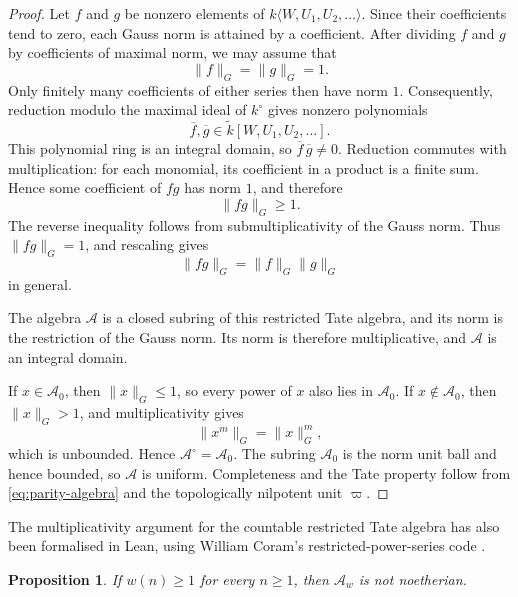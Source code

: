 \documentclass[11pt,reqno]{amsart}
\newtheorem{proposition}[proposition]{Proposition}
\theoremstyle{definition}
\begin{document}
\begin{proof}
Let $f$ and $g$ be nonzero elements of
$k\langle W,U_1,U_2,\ldots\rangle$.  Since their coefficients tend to zero,
each Gauss norm is attained by a coefficient.  After dividing $f$ and $g$ by
coefficients of maximal norm, we may assume that
\[
  \lVert f\rVert_G=\lVert g\rVert_G=1.
\]
Only finitely many coefficients of either series then have norm $1$.
Consequently, reduction modulo the maximal ideal of $k^\circ$ gives nonzero
polynomials
\[
  \overline f,\overline g
  \in \widetilde{k}[W,U_1,U_2,\ldots].
\]
This polynomial ring is an integral domain, so
$\overline f\,\overline g\neq0$.  Reduction commutes with multiplication:
for each monomial, its coefficient in a product is a finite sum.  Hence some
coefficient of $fg$ has norm $1$, and therefore
\[
  \lVert fg\rVert_G\geq1.
\]
The reverse inequality follows from submultiplicativity of the Gauss norm.
Thus $\lVert fg\rVert_G=1$, and rescaling gives
\[
  \lVert fg\rVert_G=\lVert f\rVert_G\lVert g\rVert_G
\]
in general.

The algebra $\mathcal A$ is a closed subring of this restricted Tate algebra,
and its norm is the restriction of the Gauss norm.  Its norm is therefore
multiplicative, and $\mathcal A$ is an integral domain.

If $x\in\mathcal A_0$, then $\lVert x\rVert_G\leq1$, so every power of $x$
also lies in $\mathcal A_0$.  If $x\notin\mathcal A_0$, then
$\lVert x\rVert_G>1$, and multiplicativity gives
\[
  \lVert x^m\rVert_G=\lVert x\rVert_G^m,
\]
which is unbounded.  Hence $\mathcal A^\circ=\mathcal A_0$.  The subring
$\mathcal A_0$ is the norm unit ball and hence bounded, so
$\mathcal A$ is uniform.  Completeness and the Tate property follow from
\eqref{eq:parity-algebra} and the topologically nilpotent unit $\varpi$.
\end{proof}

The multiplicativity argument for the countable restricted Tate algebra has
also been formalised in Lean, using William Coram's restricted-power-series
code \cite{CoramCode}.

\begin{proposition}\label{prop:parity-nonnoetherian}
If $w(n)\geq1$ for every $n\geq1$, then $\mathcal A_w$ is not noetherian.
\end{proposition}
\end{document}
